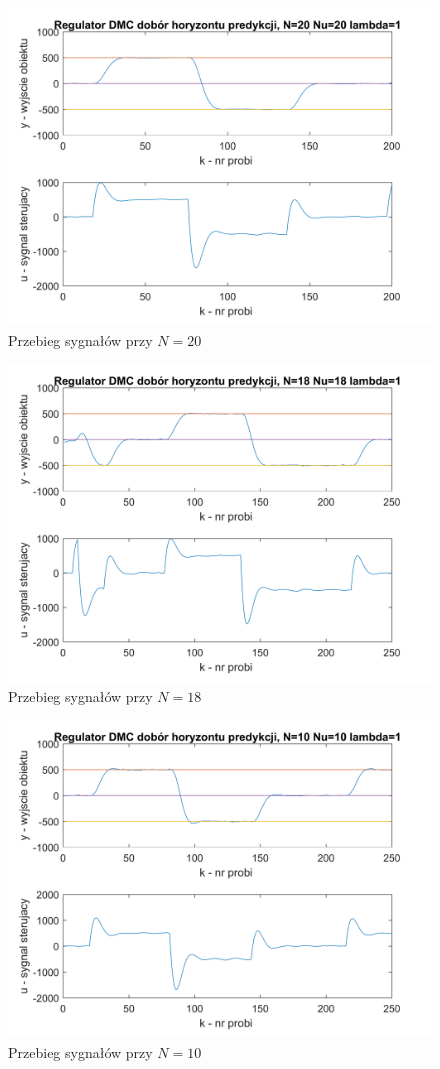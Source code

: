 \documentclass[a4paper, 10pt]{article}
\begin{document}
\begin{figure}[H]
	\centering
	\includegraphics[width=0.9\linewidth]{DMC20201}
	\caption{Przebieg sygnałów przy $N=20$}
	\label{fig:DMC20201}
\end{figure}
\begin{figure}[H]
	\centering
	\includegraphics[width=0.9\linewidth]{DMC18181}
	\caption{Przebieg sygnałów przy $N=18$}
	\label{fig:DMC18181}
\end{figure}
\begin{figure}[H]
	\centering
	\includegraphics[width=0.9\linewidth]{DMC10101}
	\caption{Przebieg sygnałów przy $N=10$}
	\label{fig:DMC10101}
\end{figure}
\end{document}
